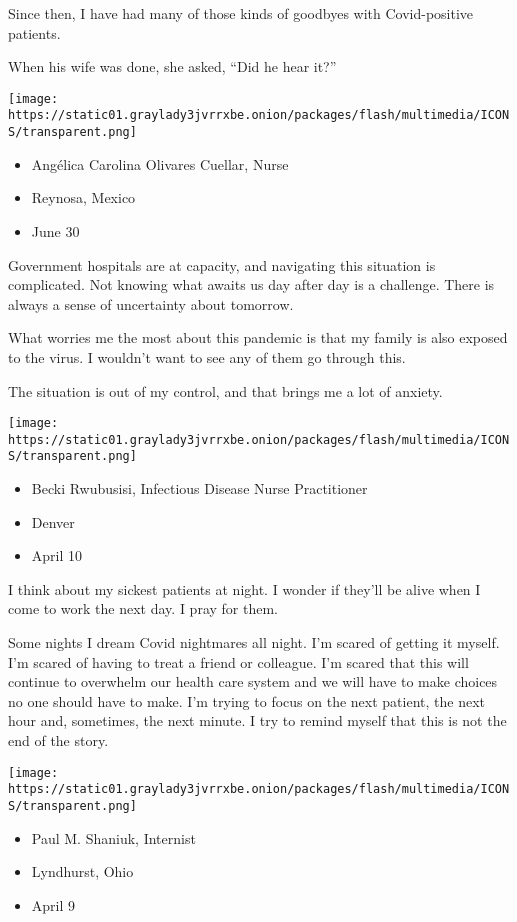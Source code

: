 Since then, I have had many of those kinds of goodbyes with
Covid-positive patients.

When his wife was done, she asked, ``Did he hear it?''

\texttt{[image: https://static01.graylady3jvrrxbe.onion/packages/flash/multimedia/ICONS/transparent.png]}

\begin{itemize}
\tightlist
\item
  Angélica Carolina Olivares Cuellar, Nurse
\item
  Reynosa, Mexico
\item
  June 30
\end{itemize}

Government hospitals are at capacity, and navigating this situation is
complicated. Not knowing what awaits us day after day is a challenge.
There is always a sense of uncertainty about tomorrow.

What worries me the most about this pandemic is that my family is also
exposed to the virus. I wouldn't want to see any of them go through
this.

The situation is out of my control, and that brings me a lot of anxiety.

\texttt{[image: https://static01.graylady3jvrrxbe.onion/packages/flash/multimedia/ICONS/transparent.png]}

\begin{itemize}
\tightlist
\item
  Becki Rwubusisi, Infectious Disease Nurse Practitioner
\item
  Denver
\item
  April 10
\end{itemize}

I think about my sickest patients at night. I wonder if they'll be alive
when I come to work the next day. I pray for them.

Some nights I dream Covid nightmares all night. I'm scared of getting it
myself. I'm scared of having to treat a friend or colleague. I'm scared
that this will continue to overwhelm our health care system and we will
have to make choices no one should have to make. I'm trying to focus on
the next patient, the next hour and, sometimes, the next minute. I try
to remind myself that this is not the end of the story.

\texttt{[image: https://static01.graylady3jvrrxbe.onion/packages/flash/multimedia/ICONS/transparent.png]}

\begin{itemize}
\tightlist
\item
  Paul M. Shaniuk, Internist
\item
  Lyndhurst, Ohio
\item
  April 9
\end{itemize}

